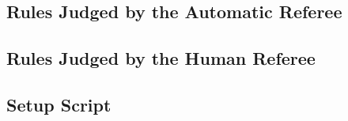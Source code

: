 \subsection{Rules Judged by the Automatic Referee}

\subsection{Rules Judged by the Human Referee}

\subsection{Setup Script}

